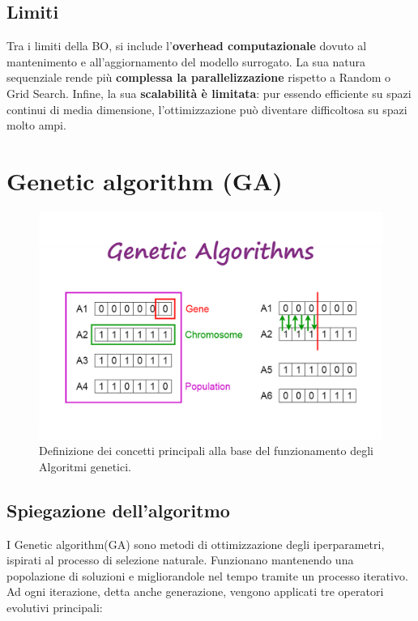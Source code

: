 \documentclass[a4paper,12pt]{report}
\begin{document}
	\subsection{Limiti}
	Tra i limiti della BO, si include l'\textbf{overhead computazionale} dovuto al mantenimento e all'aggiornamento del modello surrogato. La sua natura sequenziale rende più \textbf{complessa la parallelizzazione} rispetto a Random o Grid Search. Infine, la sua \textbf{scalabilità è limitata}: pur essendo efficiente su spazi continui di media dimensione, l'ottimizzazione può diventare difficoltosa su spazi molto ampi.
	
	\section{Genetic algorithm (GA)}
	\begin{figure}[H]
		\centering
		\includegraphics[width=1.0\textwidth]{img/ga.png}
		\caption{Definizione dei concetti principali alla base del funzionamento degli Algoritmi genetici.}
	\end{figure}
	\subsection{Spiegazione dell'algoritmo}
    I Genetic algorithm(GA) sono metodi di ottimizzazione degli iperparametri, ispirati al processo di selezione naturale. Funzionano mantenendo una popolazione di soluzioni e migliorandole nel tempo tramite un processo iterativo. Ad ogni iterazione, detta anche generazione, vengono applicati tre operatori evolutivi principali:
	
\end{document}
